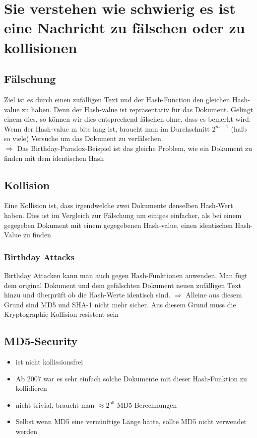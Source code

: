\documentclass{report}
\theoremstyle{definition}
\theoremstyle{example}
\begin{document}
\section{Sie verstehen wie schwierig es ist eine Nachricht zu fälschen oder zu kollisionen}
	\subsection{Fälschung}
Ziel ist es durch einen zufälligen Text und der Hash-Function den gleichen Hash-value zu haben. Denn der Hash-value ist repräsentativ für das Dokument. Gelingt einem dies, so können wir dies entsprechend fälschen ohne, dass es bemerkt wird.\\
Wenn der Hash-value m bits lang ist, braucht man im Durchschnitt $2^{m-1}$ (halb so viele) Versuche um das Dokument zu verfälschen.\\

$\Rightarrow$ Das Birthday-Paradox-Beispiel ist das gleiche Problem, wie ein Dokument zu finden mit dem identischen Hash

	\subsection{Kollision}
Eine Kollision ist, dass irgendwelche zwei Dokumente denselben Hash-Wert haben. Dies ist im Vergleich zur Fälschung um einiges einfacher, als bei einem gegegeben Dokument mit einem gegegebenen Hash-value, einen identischen Hash-Value zu finden
		\subsubsection{Birthday Attacks}
Birthday Attacken kann man auch gegen Hash-Funktionen anwenden. Man fügt dem original Dokument und dem gefälschten Dokument neuen zufälligen Text hinzu und überprüft ob die Hash-Werte identisch sind.
$\Rightarrow$ Alleine aus diesem Grund sind MD5 und SHA-1 nicht mehr sicher. Aus diesem Grund muss die Kryptographie Kollision resistent sein

	\subsection{MD5-Security}
\begin{itemize}
	\item ist nicht kollissionsfrei 
	\item Ab 2007 war es sehr einfach solche Dokumente mit dieser Hash-Funktion zu kollidieren
	\item nicht trivial, braucht man $\approx 2^{50}$ MD5-Berechnungen
	\item Selbst wenn MD5 eine vernünftige Länge hätte, sollte MD5 nicht verwendet werden
\end{itemize}
\end{document}
